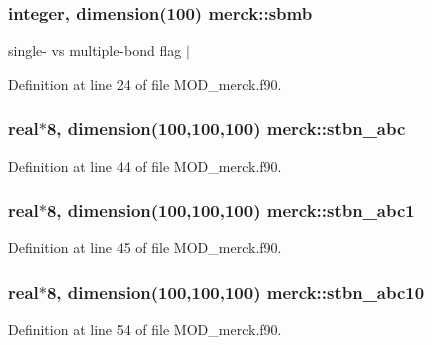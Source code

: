 \hypertarget{classmerck_a58cfa6e65d0d4dad206baafcf012474e}{
\subsubsection[{sbmb}]{\setlength{\rightskip}{0pt plus 5cm}integer, dimension(100) merck\-::sbmb}}\label{classmerck_a58cfa6e65d0d4dad206baafcf012474e}


single-\/ vs multiple-\/bond flag $|$ 



Definition at line 24 of file M\-O\-D\-\_\-merck.\-f90.

\hypertarget{classmerck_a026dca81a6c307c641bba56cfd4302f3}{
\subsubsection[{stbn\-\_\-abc}]{\setlength{\rightskip}{0pt plus 5cm}real$\ast$8, dimension(100,100,100) merck\-::stbn\-\_\-abc}}\label{classmerck_a026dca81a6c307c641bba56cfd4302f3}


Definition at line 44 of file M\-O\-D\-\_\-merck.\-f90.

\hypertarget{classmerck_a34a229bbafcaa423bb5733b21c50517c}{
\subsubsection[{stbn\-\_\-abc1}]{\setlength{\rightskip}{0pt plus 5cm}real$\ast$8, dimension(100,100,100) merck\-::stbn\-\_\-abc1}}\label{classmerck_a34a229bbafcaa423bb5733b21c50517c}


Definition at line 45 of file M\-O\-D\-\_\-merck.\-f90.

\hypertarget{classmerck_a90e51b1533b85851367dfea162630500}{
\subsubsection[{stbn\-\_\-abc10}]{\setlength{\rightskip}{0pt plus 5cm}real$\ast$8, dimension(100,100,100) merck\-::stbn\-\_\-abc10}}\label{classmerck_a90e51b1533b85851367dfea162630500}


Definition at line 54 of file M\-O\-D\-\_\-merck.\-f90.

